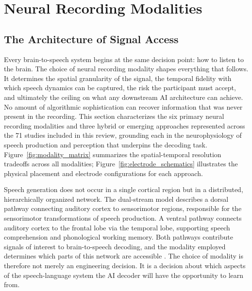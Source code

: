 
\section{Neural Recording Modalities}
\label{sec:modalities}

\subsection{The Architecture of Signal Access}

Every brain-to-speech system begins at the same decision point: how to listen to the brain. The choice of neural recording modality shapes everything that follows. It determines the spatial granularity of the signal, the temporal fidelity with which speech dynamics can be captured, the risk the participant must accept, and ultimately the ceiling on what any downstream AI architecture can achieve. No amount of algorithmic sophistication can recover information that was never present in the recording. This section characterizes the six primary neural recording modalities and three hybrid or emerging approaches represented across the 71 studies included in this review, grounding each in the neurophysiology of speech production and perception that underpins the decoding task. Figure~\ref{fig:modality_matrix} summarizes the spatial-temporal resolution tradeoffs across all modalities; Figure~\ref{fig:electrode_schematics} illustrates the physical placement and electrode configurations for each approach.

Speech generation does not occur in a single cortical region but in a distributed, hierarchically organized network. The dual-stream model \cite{Hickok2007,Poeppel2020} describes a dorsal pathway connecting auditory cortex to sensorimotor regions, responsible for the sensorimotor transformations of speech production. A ventral pathway connects auditory cortex to the frontal lobe via the temporal lobe, supporting speech comprehension and phonological working memory. Both pathways contribute signals of interest to brain-to-speech decoding, and the modality employed determines which parts of this network are accessible \cite{Herff2016,Rabbani2019}. The choice of modality is therefore not merely an engineering decision. It is a decision about which aspects of the speech-language system the AI decoder will have the opportunity to learn from.

